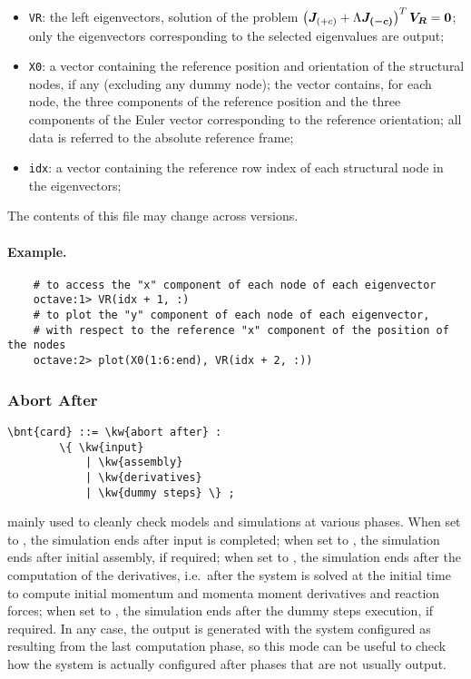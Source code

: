 \begin{itemize}
\item \texttt{VR}: the left eigenvectors, solution of the problem
$\left( \boldsymbol{J}_{(+c)} + \Lambda \boldsymbol{J_{(-c)}} \right)^T\boldsymbol{V_R}=\boldsymbol{0}$;
only the eigenvectors corresponding to the selected eigenvalues are output;

\item \texttt{X0}: a vector containing the reference position
and orientation of the structural nodes, if any (excluding any dummy node);
the vector contains, for each node, the three components
of the reference position and the three components of the Euler vector
corresponding to the reference orientation; all data is referred
to the absolute reference frame;

\item \texttt{idx}: a vector containing the reference row index
of each structural node in the eigenvectors;
\end{itemize}
The contents of this file may change across versions.

\paragraph{Example.}
\begin{verbatim}
    # to access the "x" component of each node of each eigenvector
    octave:1> VR(idx + 1, :)
    # to plot the "y" component of each node of each eigenvector,
    # with respect to the reference "x" component of the position of the nodes
    octave:2> plot(X0(1:6:end), VR(idx + 2, :))
\end{verbatim}



\subsubsection{Abort After}
\label{sec:IVP:abort after}
\begin{Verbatim}[commandchars=\\\{\}]
    \bnt{card} ::= \kw{abort after} :
        \{ \kw{input} 
            | \kw{assembly}
            | \kw{derivatives}
            | \kw{dummy steps} \} ;
\end{Verbatim}
mainly used to cleanly check models and simulations at various phases.
When set to , the simulation ends after input is completed;
when set to , the simulation ends after initial assembly,
if required;
when set to , the simulation ends after the computation
of the derivatives, i.e.\ after the system is solved at the initial
time to compute initial momentum and momenta moment derivatives and 
reaction forces;
when set to , the simulation ends after the dummy steps
execution, if required.
In any case, the output is generated with the system configured 
as resulting from the last computation phase, so this mode can be useful 
to check how the system is actually configured after phases that are not 
usually output.


